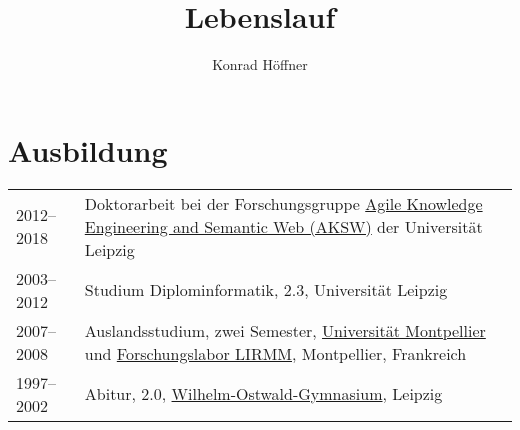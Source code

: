 \documentclass{article}
\title{Lebenslauf}
\author{Konrad Höffner}
\begin{document}
\newcommand{\citep}{}
\newcommand{\citet}{}

\maketitle

\section*{Ausbildung}
\begin{tabular}{p{3cm}p{10cm}}
2012--2018  		&Doktorarbeit bei der Forschungsgruppe \href{http://aksw.org}{Agile Knowledge Engineering and Semantic Web (AKSW)} der Universität Leipzig\\
2003--2012		&Studium Diplominformatik, 2.3, Universität Leipzig\\
2007--2008		&Auslandsstudium, zwei Semester, \href{http://www.umontpellier.fr/}{Universität Montpellier} und \href{http://www.lirmm.fr/}{Forschungslabor LIRMM}, Montpellier, Frankreich\\
1997--2002	&Abitur, 2.0, \href{http://ostwaldportal.de}{Wilhelm-Ostwald-Gymnasium}, Leipzig\\
\end{tabular}
\end{document}
